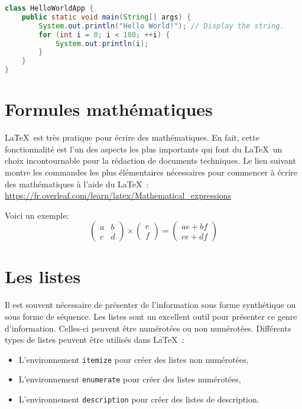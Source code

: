 \begin{lstlisting}[language=Java]
class HelloWorldApp {
    public static void main(String[] args) {
        System.out.println("Hello World!"); // Display the string.
        for (int i = 0; i < 100; ++i) {
            System.out.println(i);
        }
    }
}
\end{lstlisting}

\section{Formules mathématiques}
\LaTeX\ est très pratique pour écrire des mathématiques. En fait, cette fonctionnalité est l'un des aspects les plus importants qui font du \LaTeX\ un choix incontournable pour la rédaction de documents techniques. Le lien suivant montre les commandes les plus élémentaires nécessaires pour commencer à écrire des mathématiques à l'aide du \LaTeX\ : \url{https://fr.overleaf.com/learn/latex/Mathematical_expressions}

Voici un exemple:
\begin{equation}
\left(\begin{array}{cc}
a & b\\
c & d
\end{array}\right)
\times 
\left(\begin{array}{c}
e\\
f
\end{array}\right)
=
\left(\begin{array}{c}
ae+bf\\
ce+df
\end{array}\right)
\end{equation}

\section{Les listes}
Il est souvent nécessaire de présenter de l'information sous forme synthétique ou sous forme de séquence. Les listes sont un excellent outil pour présenter ce genre d'information. Celles-ci peuvent être numérotées ou non numérotées. Différents types de listes peuvent être utilisés dans \LaTeX\ :
\begin{itemize}
\item L'environnement \verb|itemize| pour créer des listes non numérotées,
\item L'environnement \verb|enumerate| pour créer des listes numérotées,
\item L'environnement \verb|description| pour créer des listes de description.
\end{itemize} 

